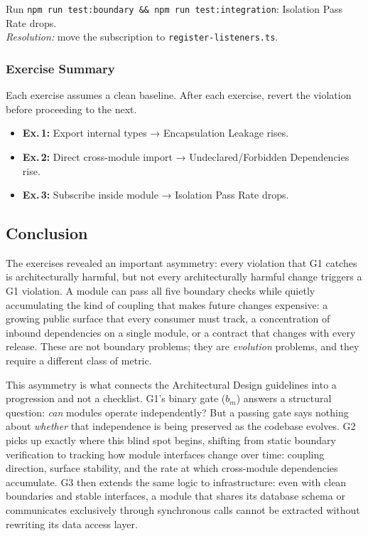 \noindent
Run \texttt{npm run test:boundary \&\& npm run test:integration}: Isolation Pass Rate drops.\\
\emph{Resolution:} move the subscription to \texttt{register-listeners.ts}.

\subsubsection*{Exercise Summary}
Each exercise assumes a clean baseline. After each exercise, revert the violation before proceeding to the next.
\begin{itemize}[itemsep=2pt,topsep=2pt]
  \item \textbf{Ex.\,1:} Export internal types → Encapsulation Leakage rises.
  \item \textbf{Ex.\,2:} Direct cross-module import → Undeclared/Forbidden Dependencies rise.
  \item \textbf{Ex.\,3:} Subscribe inside module → Isolation Pass Rate drops.
\end{itemize}

\subsection*{Conclusion}

The exercises revealed an important asymmetry: every violation that G1 catches is architecturally harmful, but not every architecturally harmful change triggers a G1 violation. A module can pass all five boundary checks while quietly accumulating the kind of coupling that makes future changes expensive: a growing public surface that every consumer must track, a concentration of inbound dependencies on a single module, or a contract that changes with every release. These are not boundary problems; they are \emph{evolution} problems, and they require a different class of metric.

This asymmetry is what connects the Architectural Design guidelines into a progression and not a checklist. G1's binary gate ($b_m$) answers a structural question: \emph{can} modules operate independently? But a passing gate says nothing about \emph{whether} that independence is being preserved as the codebase evolves. G2 picks up exactly where this blind spot begins, shifting from static boundary verification to tracking how module interfaces change over time: coupling direction, surface stability, and the rate at which cross-module dependencies accumulate. G3 then extends the same logic to infrastructure: even with clean boundaries and stable interfaces, a module that shares its database schema or communicates exclusively through synchronous calls cannot be extracted without rewriting its data access layer.


